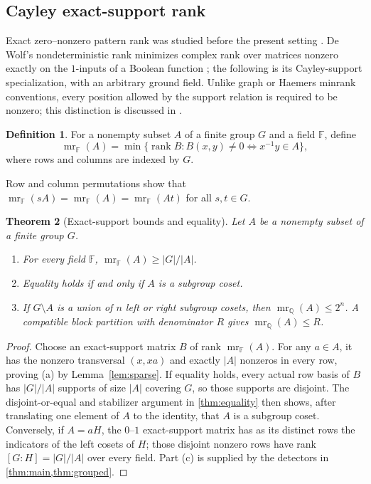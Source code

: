 \documentclass[11pt,a4paper]{amsart}
\newtheorem{theorem}{Theorem}[section]
\theoremstyle{definition}
\newtheorem{definition}[theorem]{Definition}
\theoremstyle{remark}
\newcommand{\rank}{\operatorname{rank}}
\newcommand{\mr}{\operatorname{mr}}
\newcommand{\Q}{\mathbb{Q}}
\newcommand{\F}{\mathbb{F}}
\begin{document}
\subsection{Cayley exact-support rank}
Exact zero--nonzero pattern rank was studied before the present setting
\cite{HershkowitzSchneider1993}.  De Wolf's nondeterministic rank minimizes
complex rank over matrices nonzero exactly on the $1$-inputs of a Boolean
function \cite{DeWolf2000}; the following is its Cayley-support specialization,
with an arbitrary ground field.  Unlike graph or Haemers minrank conventions, every position allowed by the
support relation is required to be nonzero; this distinction is discussed in
\cite{DeaettYoung2026}.

\begin{definition}\label{def:mr}
For a nonempty subset $A$ of a finite group $G$ and a field $\F$, define
\[
 \mr_{\F}(A)=\min\{\rank B:
 B(x,y)\ne0\Longleftrightarrow x^{-1}y\in A\},
\]
where rows and columns are indexed by $G$.
\end{definition}

Row and column permutations show that
$\mr_{\F}(sA)=\mr_{\F}(A)=\mr_{\F}(At)$ for all $s,t\in G$.

\begin{theorem}[Exact-support bounds and equality]\label{thm:mr}
Let $A$ be a nonempty subset of a finite group $G$.
\begin{enumerate}[label=(\alph*)]
\item For every field $\F$, $\mr_{\F}(A)\ge |G|/|A|$.
\item Equality holds if and only if $A$ is a subgroup coset.
\item If $G\setminus A$ is a union of $n$ left or right subgroup cosets, then
      $\mr_{\Q}(A)\le2^n$.  A compatible block partition with denominator
      $R$ gives $\mr_{\Q}(A)\le R$.
\end{enumerate}
\end{theorem}

\begin{proof}
Choose an exact-support matrix $B$ of rank $\mr_{\F}(A)$.  For any
$a\in A$, it has the nonzero transversal $(x,xa)$ and exactly $|A|$
nonzeros in every row, proving (a) by Lemma~\ref{lem:sparse}.  If equality holds,
every actual row basis of $B$ has
$|G|/|A|$ supports of size $|A|$ covering $G$, so those supports are disjoint.
The disjoint-or-equal and stabilizer argument in \cref{thm:equality} then shows,
after translating one element of $A$ to the identity, that $A$ is a subgroup
coset.  Conversely, if $A=aH$, the $0$--$1$ exact-support matrix has as its
distinct rows the indicators of the left cosets of $H$; those disjoint nonzero
rows have rank $[G:H]=|G|/|A|$ over every field.  Part (c) is supplied by the
detectors in \cref{thm:main,thm:grouped}.
\end{proof}
\end{document}
